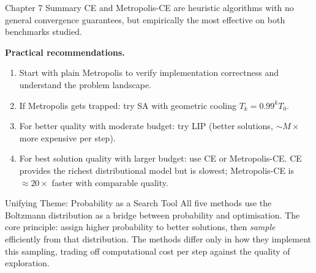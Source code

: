 \documentclass[aspectratio=169,10pt]{beamer}
\begin{document}
\begin{frame}[allowframebreaks]{Chapter 7 Summary}
CE and Metropolis-CE are heuristic algorithms with no general convergence
guarantees, but empirically the most effective on both benchmarks studied.

\medskip
\textbf{Practical recommendations.}
\begin{enumerate}
  \item Start with plain Metropolis to verify implementation correctness and
    understand the problem landscape.
  \item If Metropolis gets trapped: try SA with geometric cooling
    $T_k = 0.99^k T_0$.
  \item For better quality with moderate budget: try LIP (better solutions,
    $\sim M\times$ more expensive per step).
  \item For best solution quality with larger budget: use CE or
    Metropolis-CE.  CE provides the richest distributional model but is
    slowest; Metropolis-CE is $\approx 20\times$ faster with comparable
    quality.
\end{enumerate}

\begin{alertblock}{Unifying Theme: Probability as a Search Tool}
  All five methods use the Boltzmann distribution as a bridge between
  probability and optimisation.  The core principle: assign higher
  probability to better solutions, then \emph{sample} efficiently from that
  distribution.  The methods differ only in how they implement this sampling,
  trading off computational cost per step against the quality of exploration.
\end{alertblock}

\end{frame}
\end{document}
